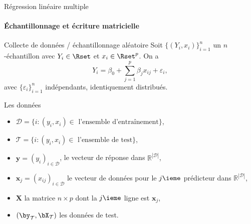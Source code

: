 \documentclass{beamer}\usepackage[]{graphicx}\usepackage[]{color}
\begin{document}
\begin{frame}{Régression linéaire multiple}
  \framesubtitle{Échantillonnage et écriture matricielle}

  \begin{block}{Collecte de données / échantillonnage aléatoire}
    Soit $\{(Y_i,x_i)\}_{i=1}^n$  un $n$-échantillon  avec $Y_i\in\Rset$
    et $x_i\in\Rset^p$. On a    
    $$Y_i = \beta_0 + \sum_{j=1}^p\beta_j x_{ij} + \varepsilon_i,$$
    avec $\{\varepsilon_i\}_{i=1}^n$ indépendants, identiquement distribués.
  \end{block}
    \vspace{-.25cm}
    
  \begin{block}{Les données}
    \vspace{-.25cm}
    \begin{itemize}
    \item $\mathcal{D} = \{i:(y_i, x_i) \in \text{ l'ensemble d'entraînement}\}$,
    \item $\mathcal{T} = \{i:(y_i, x_i) \in \text{ l'ensemble de test}\}$,
    \item  $\mathbf{y}  =   (y_i)_{i\in\mathcal{D}}$,  le  vecteur  de
      réponse  dans $\mathbb{R}^{|\mathcal{D}|}$,
    \item  $\mathbf{x}_j  = (x_{ij})_{i\in\mathcal{D}}$  le
      vecteur de données pour le $j\ieme$ prédicteur dans $\mathbb{R}^{|\mathcal{D}|}$,
    \item $\mathbf{X}$ la matrice $n\times p$ dont la $j\ieme$ ligne est $\mathbf{x}_j$,
    \item $(\by_\mathcal{T},\bX_\mathcal{T})$ les données de test.
    \end{itemize}
  \end{block}

\end{frame}
\end{document}
